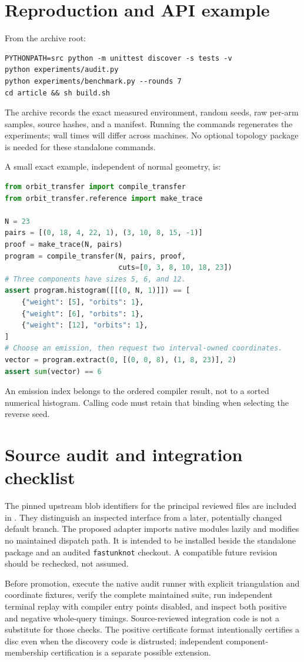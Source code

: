 \documentclass[11pt]{article}
\theoremstyle{definition}\newtheorem{definition}[theorem]{Definition}
\theoremstyle{remark}\newtheorem{remark}[theorem]{Remark}
\begin{document}
\appendix
\section{Reproduction and API example}
From the archive root:
\begin{lstlisting}
PYTHONPATH=src python -m unittest discover -s tests -v
python experiments/audit.py
python experiments/benchmark.py --rounds 7
cd article && sh build.sh
\end{lstlisting}
The archive records the exact measured environment, random seeds, raw per-arm
samples, source hashes, and a manifest. Running the commands regenerates the
experiments; wall times will differ across machines. No optional topology
package is needed for these standalone commands.

A small exact example, independent of normal geometry, is:
\begin{lstlisting}[language=Python]
from orbit_transfer import compile_transfer
from orbit_transfer.reference import make_trace

N = 23
pairs = [(0, 18, 4, 22, 1), (3, 10, 8, 15, -1)]
proof = make_trace(N, pairs)
program = compile_transfer(N, pairs, proof,
                           cuts=[0, 3, 8, 10, 18, 23])
# Three components have sizes 5, 6, and 12.
assert program.histogram([[(0, N, 1)]]) == [
    {"weight": [5], "orbits": 1},
    {"weight": [6], "orbits": 1},
    {"weight": [12], "orbits": 1},
]
# Choose an emission, then request two interval-owned coordinates.
vector = program.extract(0, [(0, 0, 8), (1, 8, 23)], 2)
assert sum(vector) == 6
\end{lstlisting}
An emission index belongs to the ordered compiler result, not to a sorted
numerical histogram. Calling code must retain that binding when selecting the
reverse seed.

\section{Source audit and integration checklist}
The pinned upstream blob identifiers for the principal reviewed files are
included in . They distinguish an inspected interface from
a later, potentially changed default branch. The proposed adapter imports
native modules lazily and modifies no maintained dispatch path. It is intended
to be installed beside the standalone package and an audited \texttt{fastunknot}
checkout. A compatible future revision should be rechecked, not assumed.

Before promotion, execute the native audit runner with explicit triangulation
and coordinate fixtures, verify the complete maintained suite, run independent
terminal replay with compiler entry points disabled, and inspect both positive
and negative whole-query timings. Source-reviewed integration code is not a
substitute for those checks. The positive certificate format intentionally
certifies a disc even when the discovery code is distrusted; independent
component-membership certification is a separate possible extension.


\end{document}
